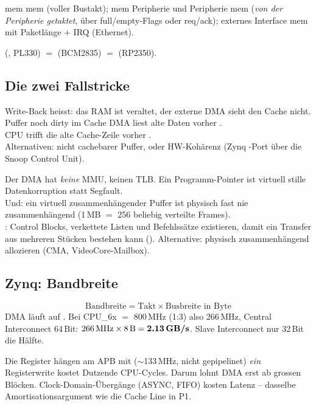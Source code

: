  mem\,\ra\,mem (voller Bustakt);
mem\,\ra\,Peripherie und Peripherie\,\ra\,mem (\emph{von der Peripherie
getaktet}, über full/empty-Flags oder req/ack);
externes Interface\,\ra\,mem mit Paketlänge $+$ IRQ (Ethernet).

\begin{formel}
 (, PL330) $=$
 (BCM2835) $=$  (RP2350).
\end{formel}

\subsection{Die zwei Fallstricke}
\label{falle:dma}
\begin{falle}
Write-Back heisst: das RAM ist veraltet, der externe DMA sieht den Cache
nicht.\\
 Puffer noch dirty im Cache \ra DMA liest alte
Daten \ra vorher .\\
 CPU trifft die alte Cache-Zeile \ra vorher
.\\
Alternativen: nicht cachebarer Puffer, oder HW-Kohärenz
(Zynq -Port über die Snoop Control Unit).
\end{falle}

\begin{falle}
Der DMA hat \emph{keine} MMU, keinen TLB. Ein Programm-Pointer ist
virtuell \ra stille Datenkorruption statt Segfault.\\
Und: ein virtuell zusammenhängender Puffer ist physisch fast nie
zusammenhängend (1\,MB $=$ 256 beliebig verteilte Frames).\\
: Control Blocks,
verkettete Listen und Befehlssätze existieren, damit ein Transfer aus
mehreren Stücken bestehen kann (). Alternative:
physisch zusammenhängend allozieren (CMA, VideoCore-Mailbox).
\end{falle}

\subsection{Zynq: Bandbreite}
\begin{formel}[Bandbreite]
\label{form:bw}
\[\text{Bandbreite}=\text{Takt}\times\text{Busbreite in Byte}\]
DMA läuft auf . Bei CPU\_6x $=$ 800\,MHz (1:3) also 266\,MHz,
Central Interconnect 64\,Bit:
$266\,\text{MHz}\times8\,\text{B}=\textbf{2.13\,GB/s}$.
Slave Interconnect nur 32\,Bit \ra die Hälfte.
\end{formel}
Die Register hängen am APB mit  ($\sim$133\,MHz, nicht
gepipelinet) \ra \emph{ein} Registerwrite kostet Dutzende CPU-Cycles.
Darum lohnt DMA erst ab grossen Blöcken.
Clock-Domain-Übergänge (ASYNC, FIFO) kosten Latenz \ra {} --
dasselbe Amortisationsargument wie die Cache Line in P1.

